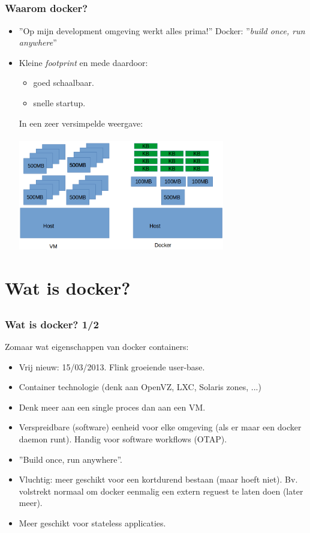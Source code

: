 \subsection{}
\begin{styleframe}
	\frametitle{Waarom docker?}
\begin{itemize}
	\pause
	\item ''Op mijn development omgeving werkt alles prima!'' \pause Docker: ''{\it build once, run anywhere}''
	\pause
	\item Kleine {\it footprint} en mede daardoor:
	\begin{itemize}
		\item goed schaalbaar.
		\item snelle startup.\\
	\end{itemize}
	\pause
	In een zeer versimpelde weergave:\\
~\\
	\includegraphics[width=9cm]{img/VM_vs_Docker.png}\\
\end{itemize}
\end{styleframe}

\section{Wat is docker?}
\subsection{}
\begin{styleframe}
	\frametitle{Wat is docker? 1/2}
\pause
Zomaar wat eigenschappen van docker containers:
\begin{itemize}
	\item Vrij nieuw: 15/03/2013. Flink groeiende user-base.
	\pause
	\item Container technologie (denk aan OpenVZ, LXC, Solaris zones, ...)
	\pause
	\item Denk meer aan een single proces dan aan een VM.
	\pause
	\item Verspreidbare (software) eenheid voor elke omgeving (als er maar een docker daemon runt). Handig voor software workflows (OTAP).
	\pause
	\item ''Build once, run anywhere''.
	\pause
	\item Vluchtig: meer geschikt voor een kortdurend bestaan (maar hoeft niet). Bv. volstrekt normaal om docker eenmalig een extern reguest te laten doen (later meer). 
	\pause
	\item Meer geschikt voor stateless applicaties.
\end{itemize}
\end{styleframe}

